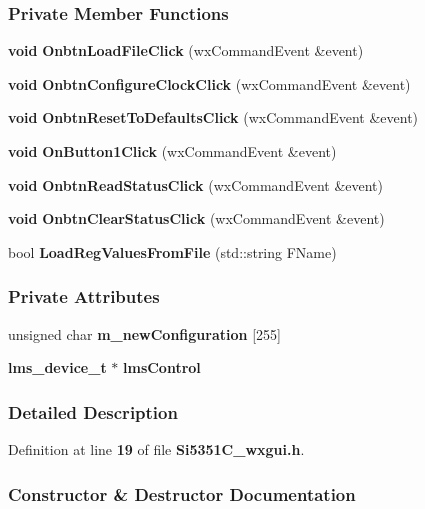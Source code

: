 \subsubsection*{Private Member Functions}
\begin{DoxyCompactItemize}
\item 
{\bf void} {\bf Onbtn\+Load\+File\+Click} (wx\+Command\+Event \&event)
\item 
{\bf void} {\bf Onbtn\+Configure\+Clock\+Click} (wx\+Command\+Event \&event)
\item 
{\bf void} {\bf Onbtn\+Reset\+To\+Defaults\+Click} (wx\+Command\+Event \&event)
\item 
{\bf void} {\bf On\+Button1\+Click} (wx\+Command\+Event \&event)
\item 
{\bf void} {\bf Onbtn\+Read\+Status\+Click} (wx\+Command\+Event \&event)
\item 
{\bf void} {\bf Onbtn\+Clear\+Status\+Click} (wx\+Command\+Event \&event)
\item 
bool {\bf Load\+Reg\+Values\+From\+File} (std\+::string F\+Name)
\end{DoxyCompactItemize}
\subsubsection*{Private Attributes}
\begin{DoxyCompactItemize}
\item 
unsigned char {\bf m\+\_\+new\+Configuration} [255]
\item 
{\bf lms\+\_\+device\+\_\+t} $\ast$ {\bf lms\+Control}
\end{DoxyCompactItemize}


\subsubsection{Detailed Description}


Definition at line {\bf 19} of file {\bf Si5351\+C\+\_\+wxgui.\+h}.



\subsubsection{Constructor \& Destructor Documentation}
